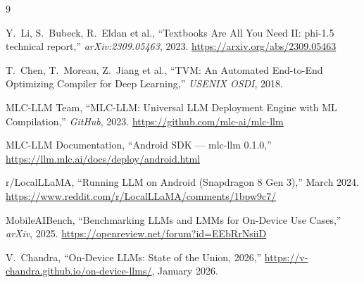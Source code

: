 \documentclass[12pt,letterpaper]{article}
\begin{document}
\begin{thebibliography}{9}

Y.\ Li, S.\ Bubeck, R.\ Eldan et al.,
``Textbooks Are All You Need II: phi-1.5 technical report,''
\textit{arXiv:2309.05463}, 2023.
\url{https://arxiv.org/abs/2309.05463}

T.\ Chen, T.\ Moreau, Z.\ Jiang et al.,
``TVM: An Automated End-to-End Optimizing Compiler for Deep Learning,''
\textit{USENIX OSDI}, 2018.

MLC-LLM Team,
``MLC-LLM: Universal LLM Deployment Engine with ML Compilation,''
\textit{GitHub}, 2023.
\url{https://github.com/mlc-ai/mlc-llm}

MLC-LLM Documentation,
``Android SDK --- mlc-llm 0.1.0,''
\url{https://llm.mlc.ai/docs/deploy/android.html}

r/LocalLLaMA,
``Running LLM on Android (Snapdragon 8 Gen 3),''
March 2024.
\url{https://www.reddit.com/r/LocalLLaMA/comments/1bpw9c7/}

MobileAIBench,
``Benchmarking LLMs and LMMs for On-Device Use Cases,''
\textit{arXiv}, 2025.
\url{https://openreview.net/forum?id=EEbRrNsiiD}

V.\ Chandra,
``On-Device LLMs: State of the Union, 2026,''
\url{https://v-chandra.github.io/on-device-llms/}, January 2026.

\end{thebibliography}
\end{document}
